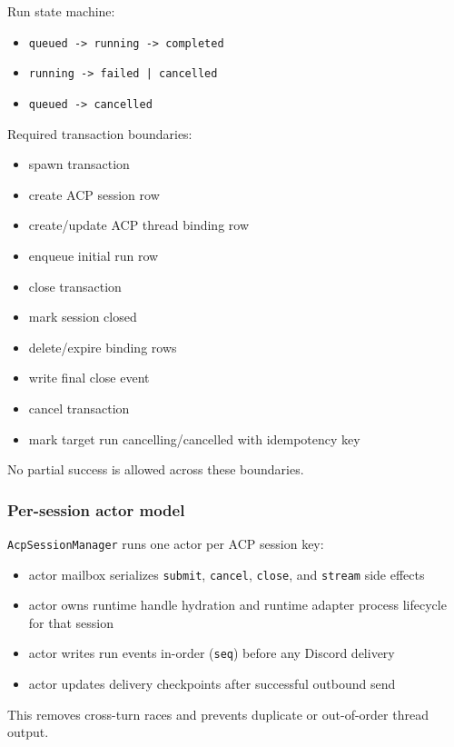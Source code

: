 Run state machine:

\begin{itemize}
  \item \texttt{queued -> running -> completed}
  \item \texttt{running -> failed | cancelled}
  \item \texttt{queued -> cancelled}
\end{itemize}


Required transaction boundaries:

\begin{itemize}
  \item spawn transaction
  \item create ACP session row
  \item create/update ACP thread binding row
  \item enqueue initial run row
  \item close transaction
  \item mark session closed
  \item delete/expire binding rows
  \item write final close event
  \item cancel transaction
  \item mark target run cancelling/cancelled with idempotency key
\end{itemize}


No partial success is allowed across these boundaries.

\subsubsection{Per-session actor model}


\texttt{AcpSessionManager} runs one actor per ACP session key:

\begin{itemize}
  \item actor mailbox serializes \texttt{submit}, \texttt{cancel}, \texttt{close}, and \texttt{stream} side effects
  \item actor owns runtime handle hydration and runtime adapter process lifecycle for that session
  \item actor writes run events in-order (\texttt{seq}) before any Discord delivery
  \item actor updates delivery checkpoints after successful outbound send
\end{itemize}


This removes cross-turn races and prevents duplicate or out-of-order thread output.

